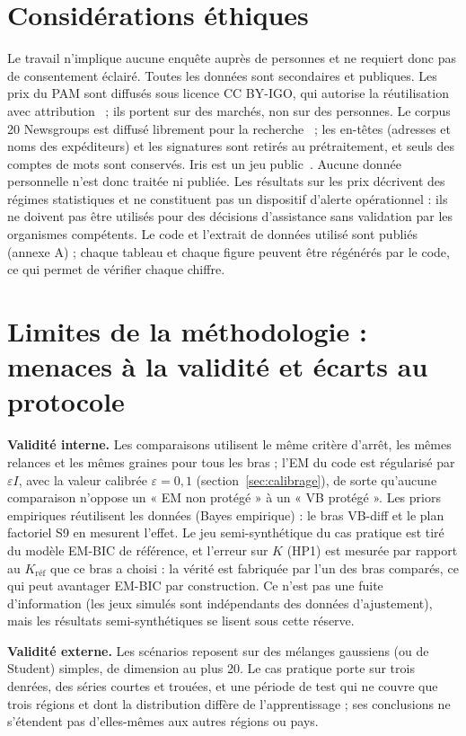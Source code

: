 \section{Considérations éthiques}\label{sec:ethique}
Le travail n'implique aucune enquête auprès de personnes et ne requiert donc pas de consentement éclairé. Toutes les données sont secondaires et publiques. Les prix du PAM sont diffusés sous licence CC BY-IGO, qui autorise la réutilisation avec attribution~\cite{pam2026donnees} ; ils portent sur des marchés, non sur des personnes. Le corpus 20 Newsgroups est diffusé librement pour la recherche~\cite{lang1995} ; les en-têtes (adresses et noms des expéditeurs) et les signatures sont retirés au prétraitement, et seuls des comptes de mots sont conservés. Iris est un jeu public~\cite{fisher1936}. Aucune donnée personnelle n'est donc traitée ni publiée. Les résultats sur les prix décrivent des régimes statistiques et ne constituent pas un dispositif d'alerte opérationnel : ils ne doivent pas être utilisés pour des décisions d'assistance sans validation par les organismes compétents. Le code et l'extrait de données utilisé sont publiés (annexe A) ; chaque tableau et chaque figure peuvent être régénérés par le code, ce qui permet de vérifier chaque chiffre.

\section{Limites de la méthodologie : menaces à la validité et écarts au protocole}\label{sec:validite}
\textbf{Validité interne. }Les comparaisons utilisent le même critère d'arrêt, les mêmes relances et les mêmes graines pour tous les bras ; l'EM du code est régularisé par $\varepsilon I$, avec la valeur calibrée $\varepsilon = 0{,}1$ (section~\ref{sec:calibrage}), de sorte qu'aucune comparaison n'oppose un « EM non protégé » à un « VB protégé ». Les priors empiriques réutilisent les données (Bayes empirique) : le bras VB-diff et le plan factoriel S9 en mesurent l'effet. Le jeu semi-synthétique du cas pratique est tiré du modèle EM-BIC de référence, et l'erreur sur $K$ (HP1) est mesurée par rapport au $K_{\text{réf}}$ que ce bras a choisi : la vérité est fabriquée par l'un des bras comparés, ce qui peut avantager EM-BIC par construction. Ce n'est pas une fuite d'information (les jeux simulés sont indépendants des données d'ajustement), mais les résultats semi-synthétiques se lisent sous cette réserve.

\textbf{Validité externe. }Les scénarios reposent sur des mélanges gaussiens (ou de Student) simples, de dimension au plus 20. Le cas pratique porte sur trois denrées, des séries courtes et trouées, et une période de test qui ne couvre que trois régions et dont la distribution diffère de l'apprentissage ; ses conclusions ne s'étendent pas d'elles-mêmes aux autres régions ou pays.

